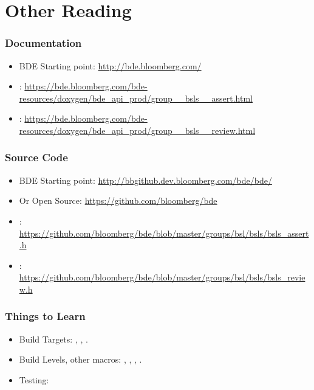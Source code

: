 \section{Other Reading}
\begin{frame}
\end{frame}

\begin{frame}[fragile]
  \frametitle{Documentation}
  \begin{itemize}
  \item{BDE Starting point: \url{http://bde.bloomberg.com/} } \pause
  \item{: \url{https://bde.bloomberg.com/bde-resources/doxygen/bde_api_prod/group__bsls__assert.html} } \pause
  \item{: \url{https://bde.bloomberg.com/bde-resources/doxygen/bde_api_prod/group__bsls__review.html} } 
  \end{itemize}
\end{frame}
  
\begin{frame}[fragile]
  \frametitle{Source Code}
  \begin{itemize}
  \item{BDE Starting point: \url{http://bbgithub.dev.bloomberg.com/bde/bde/} } \pause
  \item{Or Open Source: \url{https://github.com/bloomberg/bde} } \pause
  \item{: \url{https://github.com/bloomberg/bde/blob/master/groups/bsl/bsls/bsls_assert.h} } \pause
  \item{: \url{https://github.com/bloomberg/bde/blob/master/groups/bsl/bsls/bsls_review.h} } 
  \end{itemize}
\end{frame}
  
\begin{frame}[fragile]
  \frametitle{Things to Learn}
  \begin{itemize}
  \item{Build Targets: , , .} \pause
  \item{Build Levels, other macros: , , , .} \pause
  \item{Testing:  } 
  \end{itemize}
\end{frame}
  
